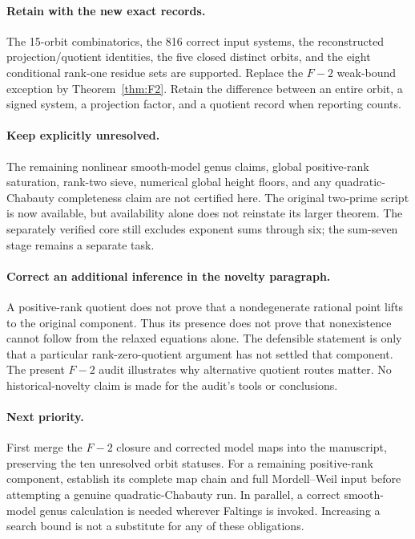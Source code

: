 \documentclass[11pt]{article}
\theoremstyle{remark}\newtheorem{remark}[theorem]{Remark}
\begin{document}
\paragraph{Retain with the new exact records.}
The 15-orbit combinatorics, the 816 correct input systems, the reconstructed projection/quotient identities, the five closed distinct orbits, and the eight conditional rank-one residue sets are supported. Replace the $F{-}2$ weak-bound exception by Theorem~\ref{thm:F2}. Retain the difference between an entire orbit, a signed system, a projection factor, and a quotient record when reporting counts.

\paragraph{Keep explicitly unresolved.}
The remaining nonlinear smooth-model genus claims, global positive-rank saturation, rank-two sieve, numerical global height floors, and any quadratic-Chabauty completeness claim are not certified here. The original two-prime script is now available, but availability alone does not reinstate its larger theorem. The separately verified core still excludes exponent sums through six; the sum-seven stage remains a separate task.

\paragraph{Correct an additional inference in the novelty paragraph.}
A positive-rank quotient does not prove that a nondegenerate rational point lifts to the original component. Thus its presence does not prove that nonexistence cannot follow from the relaxed equations alone. The defensible statement is only that a particular rank-zero-quotient argument has not settled that component. The present $F{-}2$ audit illustrates why alternative quotient routes matter. No historical-novelty claim is made for the audit's tools or conclusions.

\paragraph{Next priority.}
First merge the $F{-}2$ closure and corrected model maps into the manuscript, preserving the ten unresolved orbit statuses. For a remaining positive-rank component, establish its complete map chain and full Mordell--Weil input before attempting a genuine quadratic-Chabauty run. In parallel, a correct smooth-model genus calculation is needed wherever Faltings is invoked. Increasing a search bound is not a substitute for any of these obligations.
\end{document}
